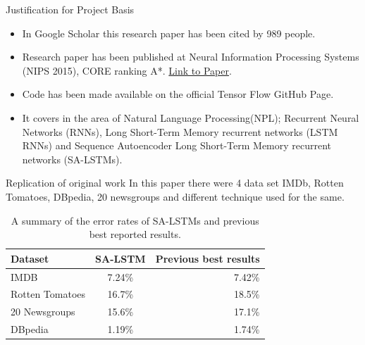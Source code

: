 \documentclass[aspectratio=169,xcolor=dvipsnames]{beamer}
\begin{document}
\begin{frame}{Justification for Project Basis}
    \begin{itemize}
        \item In Google Scholar this research paper has been cited by 989 people.
        \item Research paper has been published at Neural Information Processing Systems \break  (NIPS 2015), CORE ranking A*. \href{http://https://arxiv.org/pdf/1511.01432v1.pdf}{Link to Paper}. 
        \item  Code has been made available on the official Tensor Flow GitHub Page.
        \item  It covers in the area of Natural Language Processing(NPL); Recurrent Neural Networks (RNNs), Long Short-Term Memory recurrent networks (LSTM RNNs) and Sequence Autoencoder Long Short-Term Memory recurrent networks (SA-LSTMs).
    \end{itemize}
\end{frame}


\begin{frame}{Replication of original work}
    In this paper there were 4 data set \alert{IMDb, Rotten Tomatoes, DBpedia, 20 newsgroups} and different technique used for the same. 
    
 
   
  \begin{table}[h!]
  \begin{center}
    \caption{A summary of the error rates of SA-LSTMs and previous best reported results.}
    \label{tab:table1}
    \begin{tabular}{l|c|r} %
      \hline
      \textbf{Dataset } & \textbf{SA-LSTM} & \textbf{Previous best results}\\
      
      \hline
      IMDB & 7.24\% & 7.42\% \\
      Rotten Tomatoes & 16.7\% & 18.5\% \\
      20 Newsgroups & 15.6\% & 17.1\% \\
      DBpedia & 1.19\% & 1.74\% \\
      \hline
     
    \end{tabular}
  \end{center}
\end{table}
   
\end{frame}
\end{document}
